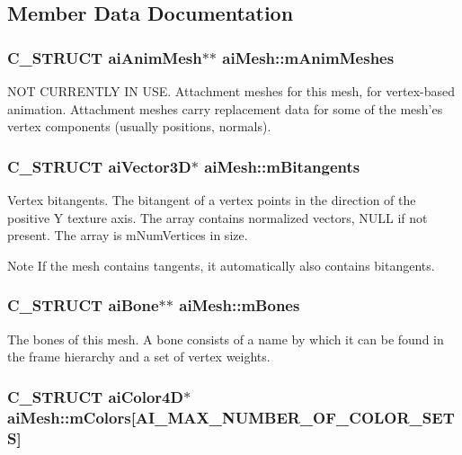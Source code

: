 \subsection{Member Data Documentation}
\hypertarget{structai_mesh_a5078f7db7e99ed05db89dfa412f0e990}{
\subsubsection[{m\-Anim\-Meshes}]{\setlength{\rightskip}{0pt plus 5cm}C\-\_\-\-S\-T\-R\-U\-C\-T {\bf ai\-Anim\-Mesh}$\ast$$\ast$ ai\-Mesh\-::m\-Anim\-Meshes}}\label{structai_mesh_a5078f7db7e99ed05db89dfa412f0e990}
N\-O\-T C\-U\-R\-R\-E\-N\-T\-L\-Y I\-N U\-S\-E. Attachment meshes for this mesh, for vertex-\/based animation. Attachment meshes carry replacement data for some of the mesh'es vertex components (usually positions, normals). \hypertarget{structai_mesh_ab2a81bfe1731f01271ebab274a8f01c4}{
\subsubsection[{m\-Bitangents}]{\setlength{\rightskip}{0pt plus 5cm}C\-\_\-\-S\-T\-R\-U\-C\-T {\bf ai\-Vector3\-D}$\ast$ ai\-Mesh\-::m\-Bitangents}}\label{structai_mesh_ab2a81bfe1731f01271ebab274a8f01c4}
Vertex bitangents. The bitangent of a vertex points in the direction of the positive Y texture axis. The array contains normalized vectors, N\-U\-L\-L if not present. The array is m\-Num\-Vertices in size. \begin{DoxyNote}{Note}
If the mesh contains tangents, it automatically also contains bitangents. 
\end{DoxyNote}
\hypertarget{structai_mesh_a0c0582a7f45b340b6a33552c53232539}{
\subsubsection[{m\-Bones}]{\setlength{\rightskip}{0pt plus 5cm}C\-\_\-\-S\-T\-R\-U\-C\-T {\bf ai\-Bone}$\ast$$\ast$ ai\-Mesh\-::m\-Bones}}\label{structai_mesh_a0c0582a7f45b340b6a33552c53232539}
The bones of this mesh. A bone consists of a name by which it can be found in the frame hierarchy and a set of vertex weights. \hypertarget{structai_mesh_ad9215f67bd0c2277b10775a8adb66b96}{
\subsubsection[{m\-Colors}]{\setlength{\rightskip}{0pt plus 5cm}C\-\_\-\-S\-T\-R\-U\-C\-T {\bf ai\-Color4\-D}$\ast$ ai\-Mesh\-::m\-Colors\mbox{[}A\-I\-\_\-\-M\-A\-X\-\_\-\-N\-U\-M\-B\-E\-R\-\_\-\-O\-F\-\_\-\-C\-O\-L\-O\-R\-\_\-\-S\-E\-T\-S\mbox{]}}}\label{structai_mesh_ad9215f67bd0c2277b10775a8adb66b96}
